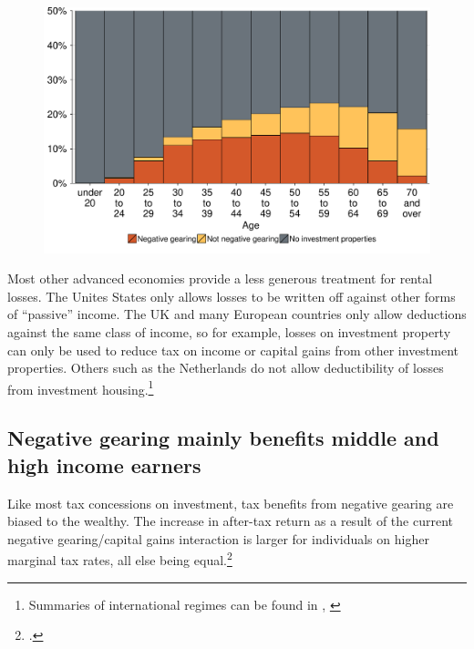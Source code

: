 \documentclass{grattan}\usepackage[]{graphicx}\usepackage[]{color}
\newcommand\gao{Grattan analysis of}
\begin{document}
\begin{figure}
\includegraphics[width=\columnwidth]{figure/Age_negative_gearing_investments-1}

\source{\gao\ \textcite{ATO2013i}}
\end{figure}

Most other advanced economies provide a less generous treatment for rental losses. The Unites States only allows losses to be written off against other forms of ``passive'' income. The UK and many European countries only allow deductions against the same class of income, so for example, losses on investment property can only be used to reduce tax on income or capital gains from other investment properties. Others such as the Netherlands do not allow deductibility of losses from investment housing.\footnote{Summaries of international regimes can be found in \textcite[p.~43]{RBA2014} \textcite[p.~86]{Commission2004}, \textcite[pp.~92-95]{ODonnell2005}}%

\subsection{Negative gearing mainly benefits middle and high income earners}
Like most tax concessions on investment, tax benefits from negative gearing are biased to the wealthy. The increase in after-tax return as a result of the current negative gearing/capital gains interaction is larger for individuals on higher marginal tax rates, all else being equal.\footcite{Inquiry2014}   
\end{document}
